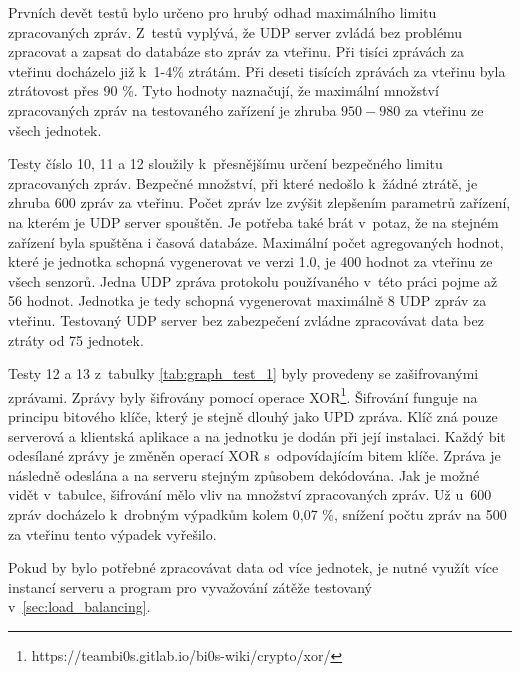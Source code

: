 Prvních devět testů bylo určeno pro hrubý odhad maximálního limitu zpracovaných zpráv. Z~testů vyplývá, že UDP server zvládá bez problému zpracovat a zapsat do databáze sto zpráv za vteřinu. Při tisíci zprávách za vteřinu docházelo již k~1-4\% ztrátám. Při deseti tisících zprávách za vteřinu byla ztrátovost přes 90 \%. Tyto hodnoty naznačují, že maximální množství zpracovaných zpráv na testovaného zařízení je zhruba $950-980$ za vteřinu ze všech jednotek. 

Testy číslo 10, 11 a 12 sloužily k~přesnějšímu určení bezpečného limitu zpracovaných zpráv. Bezpečné množství, při které nedošlo k~žádné ztrátě, je zhruba 600 zpráv za vteřinu. Počet zpráv lze zvýšit zlepšením parametrů zařízení, na kterém je UDP server spouštěn. Je potřeba také brát v~potaz, že na stejném zařízení byla spuštěna i časová databáze. Maximální počet agregovaných hodnot, které je jednotka schopná vygenerovat ve verzi 1.0, je 400 hodnot za vteřinu ze všech senzorů. Jedna UDP zpráva protokolu používaného v~této práci pojme až 56 hodnot. Jednotka je tedy schopná vygenerovat maximálně 8 UDP zpráv za vteřinu. Testovaný UDP server bez zabezpečení zvládne zpracovávat data bez ztráty od 75 jednotek.

Testy 12 a 13 z~tabulky \ref{tab:graph_test_1} byly provedeny se zašifrovanými zprávami. Zprávy byly šifrovány pomocí operace XOR\footnote{https://teambi0s.gitlab.io/bi0s-wiki/crypto/xor/}. Šifrování funguje na principu bitového klíče, který je stejně dlouhý jako UPD zpráva. Klíč zná pouze serverová a klientská aplikace a na jednotku je dodán při její instalaci. Každý bit odesílané zprávy je změněn operací XOR s~odpovídajícím bitem klíče. Zpráva je následně odeslána a na serveru stejným způsobem dekódována. Jak je možné vidět v~tabulce, šifrování mělo vliv na množství zpracovaných zpráv. Už u~600 zpráv docházelo k~drobným výpadkům kolem 0,07 \%, snížení počtu zpráv na 500 za vteřinu tento výpadek vyřešilo.

Pokud by bylo potřebné zpracovávat data od více jednotek, je nutné využít více instancí serveru a program pro vyvažování zátěže testovaný v~\ref{sec:load_balancing}.

